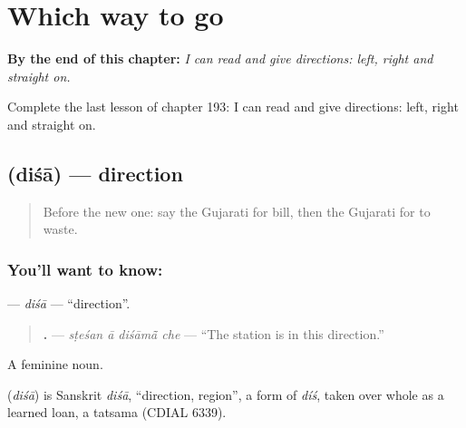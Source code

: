 
\chapter{Which way to go}
\label{ch:gu-which-way-to-go}

\begin{chapteropening}
\textbf{By the end of this chapter:} \emph{I can read and give directions: left, right and straight on.}

Complete the last lesson of chapter 193: I can read and give directions: left, right and straight on.
\end{chapteropening}

\section[\texorpdfstring{\gu{દિશા} (diśā)}{દિશા (diśā)}]{ (diśā) — direction}

\label{lesson:GU-C193-disa}



\begin{quote}
Before the new one: say the Gujarati for bill, then the Gujarati for to waste.
\end{quote}

\subsection*{You'll want to know: }
\textbf{} — \emph{diśā} — \textquotedblleft{}direction\textquotedblright{}.

\begin{quote}
\textbf{   .} — \emph{sṭeśan ā diśāmā̃ che} — \textquotedblleft{}The station is in this direction.\textquotedblright{}
\end{quote}

A feminine noun.

\begin{cousinweb}
\textbf{} (\emph{diśā}) is Sanskrit \emph{diśā}, \textquotedblleft{}direction, region\textquotedblright{}, a form of \emph{díś}, taken over whole as a learned loan, a tatsama (CDIAL 6339).
\end{cousinweb}

